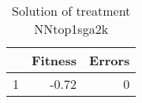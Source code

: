 \begin{table}[ht]
\centering
\begin{tabular}{rrr}
  \hline
 & Fitness & Errors \\ 
  \hline
1 & -0.72 &   0 \\ 
   \hline
\end{tabular}
\caption{Solution of treatment NNtop1sga2k} 
\end{table}
